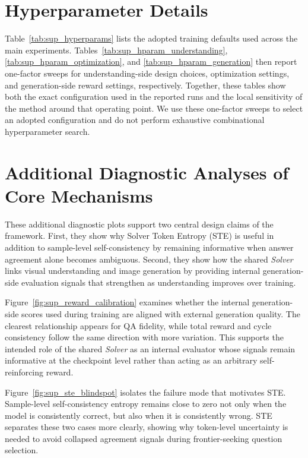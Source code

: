 \documentclass[runningheads]{llncs}
\begin{document}
\section{Hyperparameter Details}
\label{sec:sup_hyperparams}

Table~\ref{tab:sup_hyperparams} lists the adopted training defaults used across the main experiments. Tables~\ref{tab:sup_hparam_understanding}, \ref{tab:sup_hparam_optimization}, and \ref{tab:sup_hparam_generation} then report one-factor sweeps for understanding-side design choices, optimization settings, and generation-side reward settings, respectively. Together, these tables show both the exact configuration used in the reported runs and the local sensitivity of the method around that operating point. We use these one-factor sweeps to select an adopted configuration and do not perform exhaustive combinational hyperparameter search.






\section{Additional Diagnostic Analyses of Core Mechanisms}
\label{sec:sup_analysis}

These additional diagnostic plots support two central design claims of the framework. First, they show why Solver Token Entropy (STE) is useful in addition to sample-level self-consistency by remaining informative when answer agreement alone becomes ambiguous. Second, they show how the shared \emph{Solver} links visual understanding and image generation by providing internal generation-side evaluation signals that strengthen as understanding improves over training.

Figure~\ref{fig:sup_reward_calibration} examines whether the internal generation-side scores used during training are aligned with external generation quality. The clearest relationship appears for QA fidelity, while total reward and cycle consistency follow the same direction with more variation. This supports the intended role of the shared \emph{Solver} as an internal evaluator whose signals remain informative at the checkpoint level rather than acting as an arbitrary self-reinforcing reward.

Figure~\ref{fig:sup_ste_blindspot} isolates the failure mode that motivates STE. Sample-level self-consistency entropy remains close to zero not only when the model is consistently correct, but also when it is consistently wrong. STE separates these two cases more clearly, showing why token-level uncertainty is needed to avoid collapsed agreement signals during frontier-seeking question selection.
\end{document}
